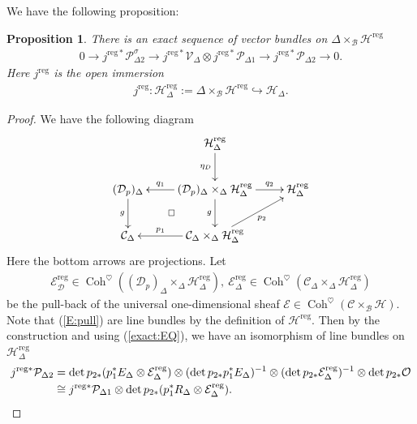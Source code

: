 \documentclass[11pt,oneside,a4paper,mathscr]{amsart}
\makeatletter
\newtheorem{prop}[thm]{Proposition}
\theoremstyle{definition}
\newcommand{\cH}{\mathcal{H}}
\newcommand{\cB}{\mathcal{B}}
\newcommand{\cC}{\mathcal{C}}
\newcommand{\cP}{\mathcal{P}}
\newcommand{\cE}{\mathcal{E}}
\newcommand{\cD}{\mathcal{D}}
\newcommand{\diasquare}{\ar@{}[rd]|\square}
\newcommand{\Coh}{\operatorname{Coh}}
\makeatother
\begin{document}
We have the following proposition: 
\begin{prop}\label{prop:exact}
There is an exact sequence of vector bundles on $\Delta\times_{\cB}\cH^{\mathrm{reg}}$
\begin{align}\label{exact:jF}
    0\to j^{\mathrm{reg}*} \cP_{\Delta 2}^{\sigma} \to j^{\mathrm{reg}*} \mathcal{V}_{\Delta}
    \otimes j^{\mathrm{reg}*} \cP_{\Delta 1}\to j^{\mathrm{reg}*} \cP_{\Delta 2}\to 0.
\end{align}
Here $j^{\mathrm{reg}}$ is the open immersion 
\begin{align*}
    j^{\mathrm{reg}}\colon \cH^{\mathrm{reg}}_{\Delta}:=\Delta\times_{\cB}\cH^{\mathrm{reg}}
    \hookrightarrow \cH_{\Delta}. 
\end{align*}
\end{prop}
\begin{proof}
   We have the following diagram
   \begin{align*}
    \xymatrix{
& \cH_{\Delta}^{\mathrm{reg}}  \ar[d]_-{\eta_D}  & \\
(\cD_p)_{\Delta} \ar[d]_-{g} \diasquare &
(\cD_{p})_{\Delta}\times_{\Delta}\cH_{\Delta}^{\mathrm{reg}}
\ar[r]^-{q_{2}} \ar[l]_-{q_{1}} \ar[d]_-{g} &
\cH_{\Delta}^{\mathrm{reg}} \\
\cC_{\Delta} & \cC_{\Delta}\times_{\Delta}\cH_{\Delta}^{\mathrm{reg}} \ar[l]_-{p_1} \ar[ru]_-{p_2}
&
}
\end{align*}
Here the bottom arrows are projections. Let 
\begin{align}\label{E:pull}
\cE_{\cD}^{\mathrm{reg}}\in \Coh^{\heartsuit}((\cD_p)_{\Delta}\times_{\Delta}\cH_{\Delta}^{\mathrm{reg}}), \
\cE^{\mathrm{reg}}_{\Delta}\in \Coh^{\heartsuit}(\cC_{\Delta}\times_{\Delta}\cH_{\Delta}^{\mathrm{reg}})
\end{align}
be the pull-back of the universal one-dimensional sheaf $\mathcal{E} \in \Coh^{\heartsuit}(\cC\times_{\cB}\cH)$. Note that (\ref{E:pull}) are line bundles by the definition of $\cH^{\mathrm{reg}}$. 
Then by the construction and using (\ref{exact:EQ}), we have an isomorphism 
of line bundles on $\cH_{\Delta}^{\mathrm{reg}}$
\begin{align}\notag
    j^{\mathrm{reg}*}\cP_{\Delta 2}&=\det p_{2*}(p_1^*E_{\Delta}\otimes 
   \cE^{\mathrm{reg}}_{\Delta})\otimes (\det p_{2*}p_1^*E_{\Delta})^{-1} \otimes (\det p_{2*}\cE^{\mathrm{reg}}_{\Delta})^{-1}\otimes \det p_{2*}\mathcal{O}\\
   \notag &\cong j^{\mathrm{reg}*}\cP_{\Delta 1}\otimes \det p_{2*}(p_1^* R_{\Delta}\otimes \cE^{\mathrm{reg}}_{\Delta}).

\end{align}
\end{proof}
\end{document}
